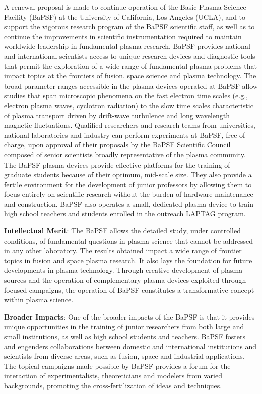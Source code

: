 \documentclass[11pt]{article}
\date{}
\title{}
\begin{document}
A renewal proposal is made to continue operation of the Basic Plasma
Science Facility (BaPSF) at the University of California, Los Angeles
(UCLA), and to support the vigorous research program of the BaPSF
scientific staff, as well as to continue the improvements in
scientific instrumentation required to maintain worldwide leadership
in fundamental plasma research. BaPSF provides national and
international scientists access to unique research devices and
diagnostic tools that permit the exploration of a wide range of
fundamental plasma problems that impact topics at the frontiers of
fusion, space science and plasma technology. The broad parameter
ranges accessible in the plasma devices operated at BaPSF allow
studies that span microscopic phenomena on the fast electron time
scales (e.g., electron plasma waves, cyclotron radiation) to the slow
time scales characteristic of plasma transport driven by drift-wave
turbulence and long wavelength magnetic fluctuations.  Qualified
researchers and research teams from universities, national
laboratories and industry can perform experiments at BaPSF, free of
charge, upon approval of their proposals by the BaPSF Scientific
Council composed of senior scientists broadly representative of the
plasma community. The BaPSF plasma devices provide effective platforms
for the training of graduate students because of their optimum,
mid-scale size. They also provide a fertile environment for the
development of junior professors by allowing them to focus entirely on
scientific research without the burden of hardware maintenance and
construction. BaPSF also operates a small, dedicated plasma device to
train high school teachers and students enrolled in the outreach
LAPTAG program.  

{\bfseries Intellectual Merit}:  The BaPSF allows the detailed
study, under controlled conditions, of fundamental questions in plasma
science that cannot be addressed in any other laboratory. The results
obtained impact a wide range of frontier topics in fusion and space
plasma research. It also lays the foundation for future developments
in plasma technology. Through creative development of plasma sources
and the operation of complementary plasma devices exploited through
focused campaigns, the operation of BaPSF constitutes a transformative
concept within plasma science.  

{\bfseries Broader Impacts}:  One of the broader
impacts of the BaPSF is that it provides unique opportunities in the
training of junior researchers from both large and small institutions,
as well as high school students and teachers. BaPSF fosters and
engenders collaborations between domestic and international
institutions and scientists from diverse areas, such as fusion, space
and industrial applications. The topical campaigns made possible by
BaPSF provides a forum for the interaction of experimentalists,
theoreticians and modelers from varied backgrounds, promoting the
cross-fertilization of ideas and techniques.
\end{document}
